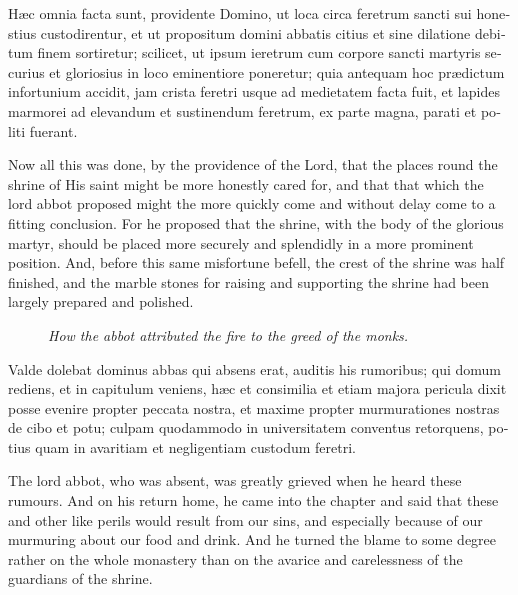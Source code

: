 \documentclass[10pt]{book}
\newcommand{\blockhead}[4][]{
\begin{figure}
\centering
\vspace{#4}
\parbox{2.75cm}{\begin{center}\footnotesize \color{BrickRed} \emph{#2}\\ #1 \end{center}}
\end{figure}
}
\begin{document}
\begin{paracol}{2}
\switchcolumn*

\begin{otherlanguage}{latin}
H\ae{}c omnia facta sunt, providente Domino, ut loca circa feretrum sancti sui honestius custodirentur, et ut propositum domini abbatis citius et sine dilatione debitum finem sortiretur; scilicet, ut ipsum ieretrum cum corpore sancti martyris securius et gloriosius in loco eminentiore poneretur; quia antequam hoc pr\ae{}dictum infortunium accidit, jam crista feretri usque ad medietatem facta fuit, et lapides marmorei ad elevandum et sustinendum feretrum, ex parte magna, parati et politi fuerant.
\end{otherlanguage}

\switchcolumn

Now all this was done, by the providence of the Lord, that the places round the shrine of His saint might be more honestly cared for, and that that which the lord abbot proposed might the more quickly come and without delay come to a fitting conclusion. For he proposed that the shrine, with the body of the glorious martyr, should be placed more securely and splendidly in a more prominent position. And, before this same misfortune befell, the crest of the shrine was half finished, and the marble stones for raising and supporting the shrine had been largely prepared and polished.

\switchcolumn*

\begin{otherlanguage}{latin}
\blockhead{How the abbot attributed the fire to the greed of the monks.}{4}{-.55cm}
Valde dolebat dominus abbas qui absens erat, auditis his rumoribus; qui domum rediens, et in capitulum veniens, h\ae{}c et consimilia et etiam majora pericula dixit posse evenire propter peccata nostra, et maxime propter murmurationes nostras de cibo et potu; culpam quodammodo in universitatem conventus retorquens, potius quam in avaritiam et negligentiam custodum feretri.

\end{otherlanguage}

\switchcolumn

The lord abbot, who was absent, was greatly grieved when he heard these rumours. And on his return home, he came into the chapter and said that these and other like perils would result from our sins, and especially because of our murmuring about our food and drink. And he turned the blame to some degree rather on the whole monastery than on the avarice and carelessness of the guardians of the shrine.


\end{paracol}
\end{document}
